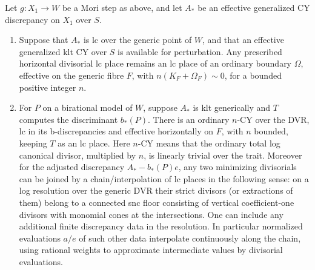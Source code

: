 \begin{lemma}\label{lem:A-lc-place-tools}
Let \(g:X_1\to W\) be a Mori step as above, and let \(A_*\) be an
effective generalized CY discrepancy on \(X_1\) over \(S\).
\begin{enumerate}[label=\textup{(\roman*)}]
\item Suppose that \(A_*\) is lc over the generic point of \(W\),
and that an effective generalized klt CY over \(S\) is available for
perturbation.  Any prescribed horizontal divisorial lc place remains
an lc place of an ordinary boundary \(\Omega\), effective on the
generic fibre \(F\), with \(n(K_F+\Omega_F)\sim0\), for a bounded
positive integer \(n\).
\item For \(P\) on a birational model of \(W\), suppose \(A_*\) is klt generically and \(T\) computes the discriminant \(b_*(P)\).
There is an ordinary \(n\)-CY over the DVR, lc in its b-discrepancies
and effective horizontally on \(F\), with \(n\) bounded, keeping
\(T\) as an lc place.  Here \(n\)-CY means that the ordinary total
log canonical divisor, multiplied by \(n\), is linearly trivial
over the trait.
Moreover for the adjusted discrepancy \(A_*-b_*(P)e\), any two minimizing divisorials can be joined by a chain/interpolation of lc places in the following sense: on a log resolution over the generic DVR their strict divisors (or extractions of them) belong to a connected snc floor consisting of vertical coefficient-one divisors with monomial cones at the intersections.
One can include any additional finite discrepancy data in the resolution.
In particular normalized evaluations \(a/e\) of such other data interpolate continuously along the chain, using rational weights to approximate intermediate values by divisorial evaluations.
\end{enumerate}

\end{lemma}

